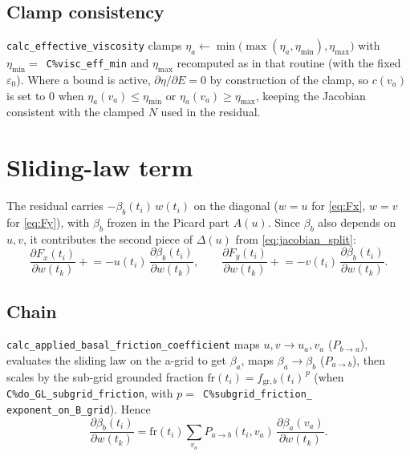 \documentclass[11pt]{article}
\newcommand{\code}[1]{\texttt{#1}}
\newcommand{\ti}{t_i}
\newcommand{\tk}{t_k}
\newcommand{\va}{v_a}
\newcommand{\pd}[2]{\dfrac{\partial #1}{\partial #2}}
\begin{document}
\subsection{Clamp consistency}
\label{sec:clamp}

\code{calc\_\allowbreak effective\_\allowbreak viscosity} clamps $\eta_a \leftarrow \min\big(\max(\eta_a,
\eta_{\min}), \eta_{\max}\big)$ with $\eta_{\min}=$~\code{C\%visc\_\allowbreak eff\_\allowbreak min}
and $\eta_{\max}$ recomputed as in that routine (with the fixed
$\varepsilon_0$). Where a bound is active, $\partial\eta/\partial E = 0$ by
construction of the clamp, so $c(\va)$ is set to $0$ when
$\eta_a(\va)\le\eta_{\min}$ or $\eta_a(\va)\ge\eta_{\max}$, keeping the
Jacobian consistent with the clamped $N$ used in the residual.

\section{Sliding-law term}
\label{sec:sliding}

The residual carries $-\beta_b(\ti)\,w(\ti)$ on the diagonal ($w=u$ for
\eqref{eq:Fx}, $w=v$ for \eqref{eq:Fy}), with $\beta_b$ frozen in the Picard
part $A(u)$. Since $\beta_b$ also depends on $u,v$, it contributes the second
piece of $\Delta(u)$ from \eqref{eq:jacobian_split}:
\begin{equation}
\pd{F_x(\ti)}{w(\tk)} \mathrel{+}= -u(\ti)\,\pd{\beta_b(\ti)}{w(\tk)}, \qquad
\pd{F_y(\ti)}{w(\tk)} \mathrel{+}= -v(\ti)\,\pd{\beta_b(\ti)}{w(\tk)}.
\label{eq:sliding_add}
\end{equation}

\subsection{Chain}

\code{calc\_\allowbreak applied\_\allowbreak basal\_\allowbreak friction\_\allowbreak coefficient} maps $u,v \to u_a,v_a$
($P_{b\to a}$), evaluates the sliding law on the a-grid to get $\beta_a$, maps
$\beta_a\to\beta_b$ ($P_{a\to b}$), then scales by the sub-grid grounded
fraction $\mathrm{fr}(\ti) = f_{\mathrm{gr},b}(\ti)^{\,p}$ (when
\code{C\%do\_\allowbreak GL\_\allowbreak subgrid\_\allowbreak friction}, with $p=$~\code{C\%subgrid\_\allowbreak friction\_\allowbreak }
\code{exponent\_\allowbreak on\_\allowbreak B\_\allowbreak grid}). Hence
\begin{equation}
\pd{\beta_b(\ti)}{w(\tk)} = \mathrm{fr}(\ti)\sum_{\va} P_{a\to b}(\ti,\va)\,\pd{\beta_a(\va)}{w(\tk)}.
\label{eq:dbeta_b}
\end{equation}
\end{document}
